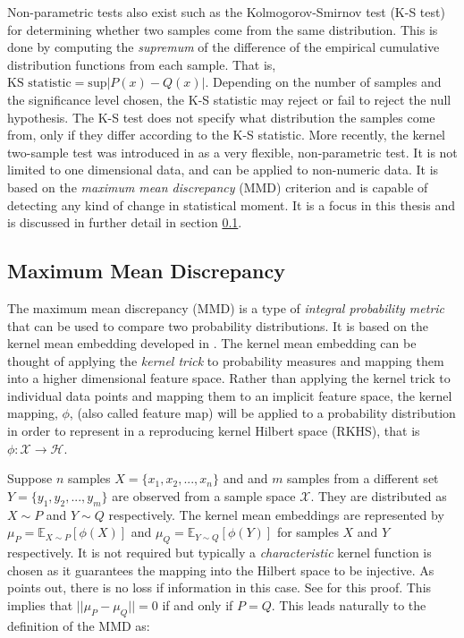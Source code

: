 
Non-parametric tests also exist such as the Kolmogorov-Smirnov test (K-S test) for determining whether two samples come from the same distribution. This is done by computing the \textit{supremum} of the difference of the empirical cumulative distribution functions from each sample. That is, $\text{KS statistic} =\text{sup} |P(x) - Q(x)|$. Depending on the number of samples and the significance level chosen, the K-S statistic may reject or fail to reject the null hypothesis. The K-S test does not specify what distribution the samples come from, only if they differ according to the K-S statistic. More recently, the kernel two-sample test was introduced in \cite{gretton2012kernel} as a very flexible, non-parametric test. It is not limited to one dimensional data, and can be applied to non-numeric data. It is based on the \textit{maximum mean discrepancy} (MMD) criterion and is capable of detecting any kind of change in statistical moment. It is a focus in this thesis and is discussed in further detail in section \ref{mmd}.

\subsection{Maximum Mean Discrepancy}
\label{mmd}
The maximum mean discrepancy (MMD) is a type of \textit{integral probability metric} that can be used to compare two probability distributions. It is based on the kernel mean embedding developed in \cite{smola2007hilbert}. The kernel mean embedding can be thought of applying the \textit{kernel trick} to probability measures and mapping them into a higher dimensional feature space. Rather than applying the kernel trick to individual data points and mapping them to an implicit feature space, the kernel mapping, $\phi$, (also called feature map) will be applied to a probability distribution in order to represent in a reproducing kernel Hilbert space (RKHS), that is $\phi: \mathcal{X} \rightarrow \mathcal{H}$.

Suppose $n$ samples $X = \{x_1, x_2, ..., x_n\}$ and and $m$ samples from a different set $Y=\{y_1, y_2, ..., y_m\}$ are observed from a sample space $\mathcal{X}$. They are distributed as $X \sim  P$ and $Y \sim Q$ respectively. The kernel mean embeddings are represented by $\mu_P = \mathbb{E}_{X \sim P}[\phi(X)] $ and $\mu_Q =\mathbb{E}_{Y \sim Q}[\phi(Y)]$ for samples $X$ and $Y$ respectively. It is not required but typically a \textit{characteristic} kernel function is chosen as it guarantees the mapping into the Hilbert space to be injective. As \cite{muandet2017kernel} points out, there is no loss if information in this case. See \cite{fukumizu2008kernel} for this proof. This implies that $||\mu_P - \mu_Q ||=0$ if and only if $P=Q$. This leads naturally to the definition of the MMD as:

